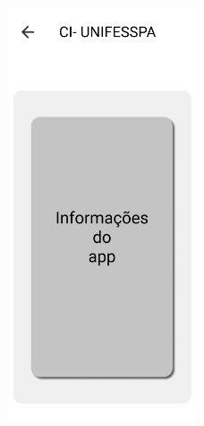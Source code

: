 \begin{apendicesenv}
\begin{figure}[H]
    \centering
    \includegraphics[width=0.5\textwidth]{figuras/Apêndice A/Info.png}
\end{figure}

% 


% 


% 




\end{apendicesenv}
